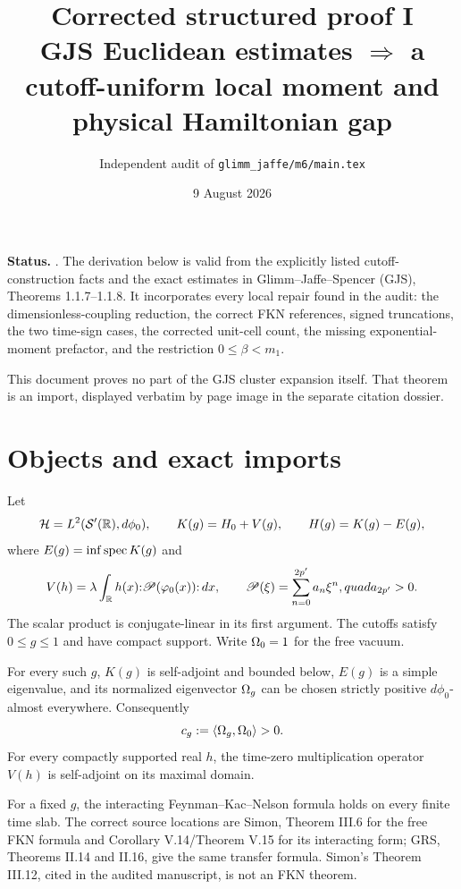 \documentclass[11pt,a4paper]{article}
\title{Corrected structured proof I\\[3pt]
GJS Euclidean estimates $\Longrightarrow$ a cutoff-uniform local moment and physical Hamiltonian gap}
\author{Independent audit of \texttt{glimm\_jaffe/m6/main.tex}}
\date{9 August 2026}
\begin{document}
\maketitle

\begin{resultbox}
\textbf{Status.} \Conditional.  The derivation below is valid from the explicitly listed
cutoff-construction facts and the exact estimates in Glimm--Jaffe--Spencer (GJS),
Theorems 1.1.7--1.1.8.  It incorporates every local repair found in the audit: the
dimensionless-coupling reduction, the correct FKN references, signed truncations, the
two time-sign cases, the corrected unit-cell count, the missing exponential-moment
prefactor, and the restriction $0\leq\beta<m_1$.

This document proves no part of the GJS cluster expansion itself.  That theorem is an
import, displayed verbatim by page image in the separate citation dossier.
\end{resultbox}

\tableofcontents

\section{Objects and exact imports}

Let
\[
 \mathcal H=L^2(\mathcal S'(\mathbb R),d\phi_0),\qquad
 K(g)=H_0+V(g),\qquad H(g)=K(g)-E(g),
\]
where $E(g)=\inf\operatorname{spec} K(g)$ and
\[
 V(h)=\lambda\int_{\mathbb R}h(x){:}\mathscr P(\varphi_0(x)){:}\,dx,
 \qquad \mathscr P(\xi)=\sum_{n=0}^{2p'}a_n\xi^n,quad a_{2p'}>0.
\]
The scalar product is conjugate-linear in its first argument.  The cutoffs satisfy
$0\leq g\leq1$ and have compact support.  Write $\Omega_0=1$ for the free vacuum.

\begin{assumption}\label{ass:cutoff}
For every such $g$, $K(g)$ is self-adjoint and bounded below, $E(g)$ is a simple
eigenvalue, and its normalized eigenvector $\Omega_g$ can be chosen strictly positive
$d\phi_0$-almost everywhere.  Consequently
\[
 c_g:=\langle \Omega_g,\Omega_0\rangle>0.
\]
For every compactly supported real $h$, the time-zero multiplication operator $V(h)$
is self-adjoint on its maximal domain.
\end{assumption}

\begin{assumption}\label{ass:fkn}
For a fixed $g$, the interacting Feynman--Kac--Nelson formula holds on every finite
time slab.  The correct source locations are Simon, Theorem III.6 for the free FKN
formula and Corollary V.14/Theorem V.15 for its interacting form; GRS, Theorems
II.14 and II.16, give the same transfer formula.  Simon's Theorem III.12, cited in
the audited manuscript, is not an FKN theorem.
\end{assumption}
\end{document}
